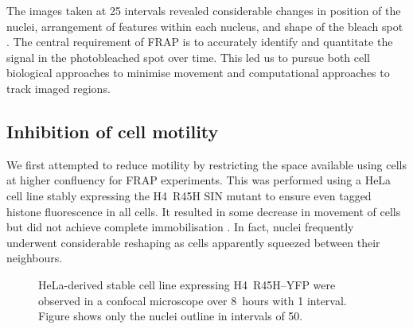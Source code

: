     The images taken at \SI{25}{\min} intervals revealed considerable changes
    in position of the nuclei, arrangement of features within each nucleus,
    and shape of the bleach spot .
    The central requirement of FRAP is to accurately identify and
    quantitate the signal in the photobleached spot over time.
    This led us to pursue both cell biological approaches to minimise movement
    and computational approaches to track imaged regions.

  \subsection{Inhibition of cell motility}

    We first attempted to reduce motility by restricting the space available
    using cells at higher confluency for FRAP experiments.
    This was performed using a HeLa cell line stably expressing
    the H4~R45H SIN mutant to ensure even
    tagged histone fluorescence in all cells.
    It resulted in some decrease in movement of cells
    but did not achieve complete immobilisation
    .
    In fact, nuclei frequently underwent considerable reshaping as cells
    apparently squeezed between their neighbours.

    \begin{figure}
      \centering
        {
          HeLa-derived stable cell line expressing H4~R45H--YFP
          were observed in a confocal microscope over 8~hours with
          \SI{1}{\min} interval.  Figure shows only the nuclei outline
          in intervals of \SI{50}{\min}.
        }
      \label{fig:kill-frap:confluent-hela}
    \end{figure}

